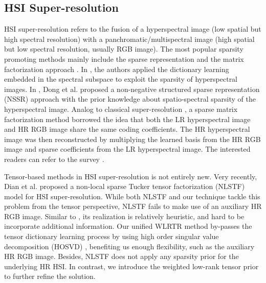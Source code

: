 \documentclass[twocolumn]{svjour3}          %
\begin{document}
   \subsection{HSI Super-resolution}
    HSI super-resolution refers to the fusion of a hyperspectral image (low spatial but high spectral resolution) with a panchromatic/multispectral image (high spatial but low spectral resolution, usually RGB image). The most popular sparsity promoting methods mainly include the sparse representation \cite{wei2015hyperspectral, akhtar2014sparse, jiang2015pan, li2013remote, chen2014image, akhtar2015bayesian} and the matrix factorization approach \cite{yokoya2012coupled, dong2016hyperspectral, kawakami2011high, wycoff2013non, lanaras2015hyperspectral}. In \cite{wei2015hyperspectral}, the authors applied the dictionary learning embedded in the spectral subspace to exploit the sparsity of hyperspectral images. In \cite{dong2016hyperspectral}, Dong et al. proposed a non-negative structured sparse representation (NSSR) approach with the prior knowledge about spatio-spectral sparsity of the hyperspectral image. Analog to classical super-resolution \cite{yang2010image}, a sparse matrix factorization method \cite{kawakami2011high} borrowed the idea that both the LR hyperspectral image and HR RGB image share the same coding coefficients. The HR hyperspectral image was then reconstructed by multiplying the learned basis from the HR RGB image and sparse coefficients from the LR hyperspectral image. The interested readers can refer to the survey \cite{loncan2015hyperspectral}.

    Tensor-based methods in HSI super-resolution is not entirely new. Very recently, Dian et al. \cite{dian2017hyperspectral} proposed a non-local sparse Tucker tensor factorization (NLSTF) model for HSI super-resolution. While both NLSTF and our technique tackle this problem from the tensor perspective, NLSTF fails to make use of an auxiliary HR RGB image. Similar to \cite{peng2014decomposable}, its realization is relatively heuristic, and hard to be incorporate additional information. Our unified WLRTR method by-passes the tensor dictionary learning process by using high order singular value decomposition (HOSVD) \cite{rajwade2013image}, benefiting us enough flexibility, such as the auxiliary HR RGB image. Besides, NLSTF does not apply any sparsity prior for the underlying HR HSI. In contrast, we introduce the weighted low-rank tensor prior to further refine the solution.
\end{document}
